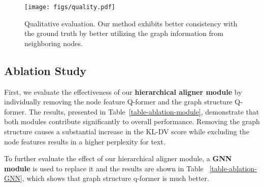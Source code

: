 \begin{figure*}
    \centering
    \texttt{[image: figs/quality.pdf]}
    \caption{Qualitative evaluation. Our method exhibits better consistency with the ground truth by better utilizing the graph information from neighboring nodes.}
    \label{fig:enter-label}
\end{figure*}
\subsection{Ablation Study}
First, we evaluate the effectiveness of our \textbf{hierarchical aligner module} by individually removing the node feature Q-former and the graph structure Q-former. The results, presented in Table~\ref{table-ablation-module}, demonstrate that both modules contribute significantly to overall performance. Removing the graph structure causes a substantial increase in the KL-DV score while excluding the node features results in a higher perplexity for text.

\begin{table}
\centering
{}
\caption{The impact of different modules in \Ours. w/o GSQ means without graph structure Q-Former and w/o NFQ means without node feature Q-Former.}
\label{table-ablation-module}
\end{table}

To further evaluate the effect of our hierarchical aligner module, a \textbf{GNN module} is used to replace it and the results are shown in Table ~\ref{table-ablation-GNN}, which shows that graph structure q-former is much better.

